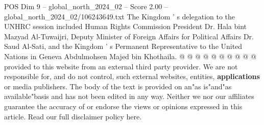 \begin{textsample}{POS Dim 9 – global\_north\_2024\_02 – Score 2.00 – global\_north\_2024\_02/106243649.txt}
The Kingdom ' s delegation to the UNHRC session included Human Rights Commission President Dr.
Hala bint Mazyad Al-Tuwaijri, Deputy Minister of Foreign Affairs for Political Affairs Dr.
Saud Al-Sati, and the Kingdom ' s Permanent Representative to the United Nations in Geneva Abdulmohsen Majed bin Khothaila. @ @ @ @ @ @ @ @ @ @ provided to this website from an external third party provider.
We are not responsible for, and do not control, such external websites, entities, \textbf{applications} or media publishers.
The body of the text is provided on an"as is"and"as available"basis and has not been edited in any way.
Neither we nor our affiliates guarantee the accuracy of or endorse the views or opinions expressed in this article.
Read our full disclaimer policy here.

\end{textsample}
